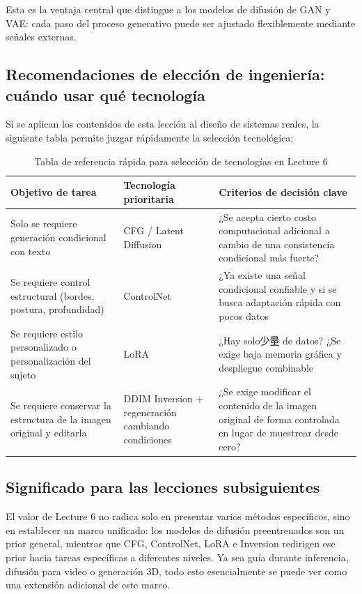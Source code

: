 \documentclass[a4paper]{article}
\begin{document}
Esta es la ventaja central que distingue a los modelos de difusión de GAN y VAE: cada paso del proceso generativo puede ser ajustado flexiblemente mediante señales externas.

\subsection{Recomendaciones de elección de ingeniería: cuándo usar qué tecnología}

Si se aplican los contenidos de esta lección al diseño de sistemas reales, la siguiente tabla permite juzgar rápidamente la selección tecnológica:

\begin{table}[H]
\centering
\begin{tabular}{p{} p{} p{}}
\toprule
Objetivo de tarea & Tecnología prioritaria & Criterios de decisión clave \\
\midrule
Solo se requiere generación condicional con texto & CFG / Latent Diffusion & ¿Se acepta cierto costo computacional adicional a cambio de una consistencia condicional más fuerte? \\
Se requiere control estructural (bordes, postura, profundidad) & ControlNet & ¿Ya existe una señal condicional confiable y si se busca adaptación rápida con pocos datos \\
Se requiere estilo personalizado o personalización del sujeto & LoRA & ¿Hay solo少量 de datos? ¿Se exige baja memoria gráfica y despliegue combinable \\
Se requiere conservar la estructura de la imagen original y editarla & DDIM Inversion + regeneración cambiando condiciones & ¿Se exige modificar el contenido de la imagen original de forma controlada en lugar de muestrear desde cero? \\
\bottomrule
\end{tabular}
\caption{Tabla de referencia rápida para selección de tecnologías en Lecture 6}
\end{table}

\subsection{Significado para las lecciones subsiguientes}

El valor de Lecture 6 no radica solo en presentar varios métodos específicos, sino en establecer un marco unificado: los modelos de difusión preentrenados son un prior general, mientras que CFG, ControlNet, LoRA e Inversion redirigen ese prior hacia tareas específicas a diferentes niveles. Ya sea guía durante inferencia, difusión para video o generación 3D, todo esto esencialmente se puede ver como una extensión adicional de este marco.
\end{document}
